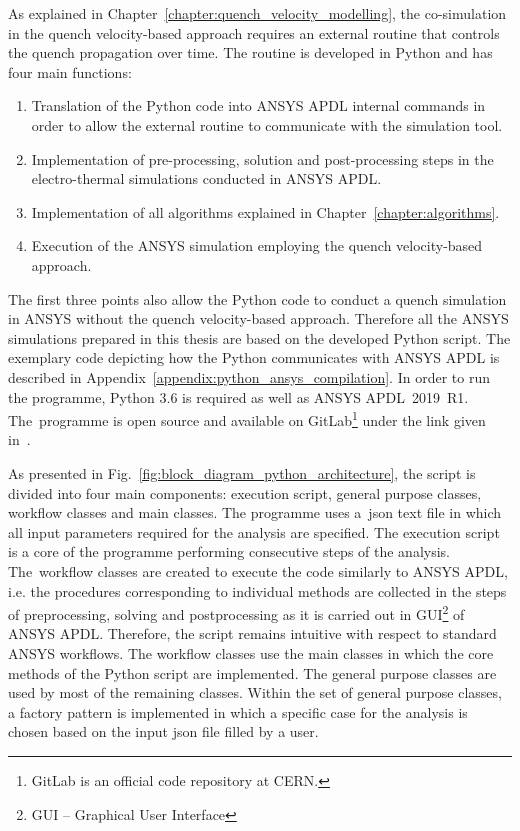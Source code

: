 
As explained in Chapter~\ref{chapter:quench_velocity_modelling}, the co-simulation in the quench velocity-based approach requires an external routine that controls the quench propagation over time. The routine is developed in Python and has four main functions: 

\begin{enumerate}
    \item Translation of the Python code into ANSYS APDL internal commands in order to allow the external routine to communicate with the simulation tool. 
    \item Implementation of pre-processing, solution and post-processing steps in the electro-thermal simulations conducted in ANSYS APDL.
    \item Implementation of all algorithms explained in Chapter~\ref{chapter:algorithms}.
    \item Execution of the ANSYS simulation employing the quench velocity-based approach. 
\end{enumerate}

The first three points also allow the Python code to conduct a quench simulation in ANSYS without the quench velocity-based approach. Therefore all the ANSYS simulations prepared in this thesis are based on the developed Python script. The exemplary code depicting how the Python communicates with ANSYS APDL is described in Appendix~\ref{appendix:python_ansys_compilation}. In order to run the programme, Python 3.6 is required as well as ANSYS APDL~2019~R1. The~programme is open source and available on GitLab\footnote{GitLab is an official code repository at CERN.} under the link given in~\cite{my_python_code}.

As presented in Fig.~\ref{fig:block_diagram_python_architecture}, the script is divided into four main components: execution script, general purpose classes, workflow classes and main classes. The programme uses a~json text file in which all input parameters required for the analysis are specified. The execution script is a core of the programme performing consecutive steps of the analysis. The~workflow classes are created to execute the code similarly to ANSYS APDL, i.e. the procedures corresponding to individual methods are collected in the steps of preprocessing, solving and postprocessing as it is carried out in GUI\footnote{GUI -- Graphical User Interface} of ANSYS APDL. Therefore, the script remains intuitive with respect to standard ANSYS workflows. The workflow classes use the main classes in which the core methods of the Python script are implemented. The general purpose classes are used by most of the remaining classes. Within the set of general purpose classes, a factory pattern is implemented in which a specific case for the analysis is chosen based on the input json file filled by a user.

